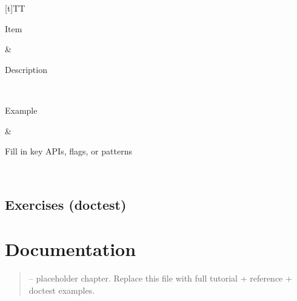 \documentclass[a4paper,11pt,english]{sphinxmanual}
\begin{document}
\begin{savenotes}\sphinxattablestart
\sphinxthistablewithglobalstyle
\centering
\begin{tabulary}{\linewidth}[t]{TT}
\sphinxtoprule
\begin{varwidth}[t]{}
\sphinxstyletheadfamily \sphinxAtStartPar
Item
\sphinxbeforeendvarwidth
\end{varwidth}%
&\begin{varwidth}[t]{}
\sphinxstyletheadfamily \sphinxAtStartPar
Description
\sphinxbeforeendvarwidth
\end{varwidth}%
\\
\sphinxmidrule
\sphinxtableatstartofbodyhook\begin{varwidth}[t]{}
\sphinxAtStartPar
Example
\sphinxbeforeendvarwidth
\end{varwidth}%
&\begin{varwidth}[t]{}
\sphinxAtStartPar
Fill in key APIs, flags, or patterns
\sphinxbeforeendvarwidth
\end{varwidth}%
\\
\sphinxbottomrule
\end{tabulary}
\sphinxtableafterendhook\par
\sphinxattableend\end{savenotes}


\subsection{Exercises (doctest)}
\label{\detokenize{typing/gradual_typing:exercises-doctest}}
\begin{sphinxVerbatim}[commandchars=\\\{\}]
\end{sphinxVerbatim}

\sphinxstepscope


\section{Documentation}
\label{\detokenize{best_practices/documentation:documentation}}\label{\detokenize{best_practices/documentation::doc}}\begin{quote}

\sphinxAtStartPar
{} – placeholder chapter. Replace this file with full tutorial + reference + doctest examples.
\end{quote}
\end{document}
